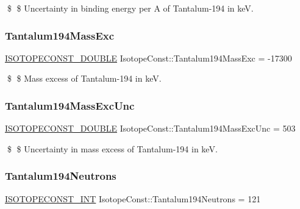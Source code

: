 \$ \$ Uncertainty in binding energy per A of Tantalum-\/194 in keV. \mbox{\label{group___isotope_const-_tantalum-_ta194_gafa79365c6f5a6795fc01e7e09419c337}} 
\subsubsection{\texorpdfstring{Tantalum194\+Mass\+Exc}{Tantalum194MassExc}}
{\footnotesize\ttfamily \mbox{\hyperlink{group___isotope_const-_macros_ga8f45a7272ce02c0b4c65c44636ed719a}{I\+S\+O\+T\+O\+P\+E\+C\+O\+N\+S\+T\+\_\+\+D\+O\+U\+B\+LE}} Isotope\+Const\+::\+Tantalum194\+Mass\+Exc = -\/17300}

\$ \$ Mass excess of Tantalum-\/194 in keV. \mbox{\label{group___isotope_const-_tantalum-_ta194_ga5fb1e24a626123b7a590fd5c084e925a}} 
\subsubsection{\texorpdfstring{Tantalum194\+Mass\+Exc\+Unc}{Tantalum194MassExcUnc}}
{\footnotesize\ttfamily \mbox{\hyperlink{group___isotope_const-_macros_ga8f45a7272ce02c0b4c65c44636ed719a}{I\+S\+O\+T\+O\+P\+E\+C\+O\+N\+S\+T\+\_\+\+D\+O\+U\+B\+LE}} Isotope\+Const\+::\+Tantalum194\+Mass\+Exc\+Unc = 503}

\$ \$ Uncertainty in mass excess of Tantalum-\/194 in keV. \mbox{\label{group___isotope_const-_tantalum-_ta194_ga4dc03b29e26ded9c09acca6b168dbf55}} 
\subsubsection{\texorpdfstring{Tantalum194\+Neutrons}{Tantalum194Neutrons}}
{\footnotesize\ttfamily \mbox{\hyperlink{group___isotope_const-_macros_ga5f18360b3e99483a35c32d789e62621c}{I\+S\+O\+T\+O\+P\+E\+C\+O\+N\+S\+T\+\_\+\+I\+NT}} Isotope\+Const\+::\+Tantalum194\+Neutrons = 121}

